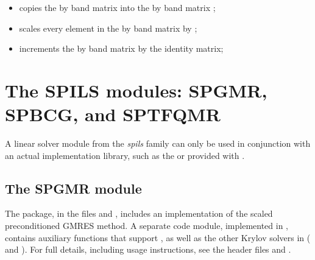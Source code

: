 \begin{itemize}
\item {}
  \par {} copies the  by  band 
  matrix  into the  by  band matrix ;

\item {}
  \par {} scales every element in the  by  band
  matrix  by ;

\item {}
  \par {} increments the  by  band matrix  by the
  identity matrix;

\end{itemize}





\section{The SPILS modules: SPGMR, SPBCG, and SPTFQMR}\label{s:spils}

{\warn}A linear solver module from the {\em spils} family can only be used in conjunction 
with an actual {\nvector} implementation library, such as the {\nvecs} or {\nvecp} provided 
with {\sundials}.


\subsection{The SPGMR module}\label{ss:spgmr}

The {\spgmr} package, in the files  and , includes an
implementation of the scaled preconditioned GMRES method.  
A separate code module, implemented in , contains auxiliary
functions that support {\spgmr}, as well as the other Krylov solvers in {\sundials}
({\spbcg} and {\sptfqmr}).
For full details, including usage instructions, see the header
files  and .

